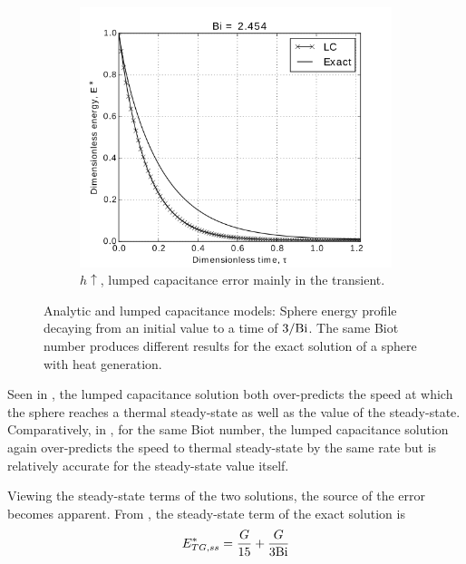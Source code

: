 \begin{figure}
        \begin{subfigure}[b]{0.5\textwidth}
                \includegraphics[width=\textwidth]{figures/LC-analytic-sphere-in-fluid-Bi-2b}
                \caption{$h \uparrow$, lumped capacitance error mainly in the transient.}
				\label{fig:LC-analytic-sphere-in-fluid-Bi-2b}
        \end{subfigure}
        \caption[Analytic temperature profile for moderate Biot number]{Analytic and lumped capacitance models: Sphere energy profile decaying from an initial value to a time of $3/\mathrm{Bi}$. The same Biot number produces different results for the exact solution of a sphere with heat generation.}\label{fig:LC-analytic-sphere-in-fluid-Bi-2}
\end{figure}

Seen in , the lumped capacitance solution both over-predicts the speed at which the sphere reaches a thermal steady-state as well as the value of the steady-state. Comparatively, in , for the same Biot number, the lumped capacitance solution again over-predicts the speed to thermal steady-state by the same rate but is relatively accurate for the steady-state value itself. 

Viewing the steady-state terms of the two solutions, the source of the error becomes apparent. From , the steady-state term of the exact solution is
\begin{equation}
	E^*_{TG,ss}=\frac{G}{15}+\frac{G}{3\mathrm{Bi}}
\end{equation}

